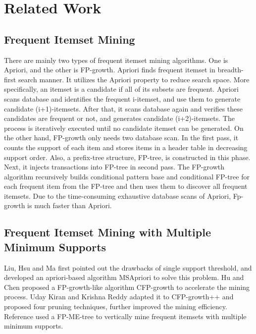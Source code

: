 \documentclass[conference]{IEEEtran}
\begin{document}
\section{Related Work}\label{sec2}
\subsection{Frequent Itemset Mining}
There are mainly two types of frequent itemset mining algorithms. 
One is Apriori\cite{b16}, and the other is FP-growth\cite{b17}. 
Apriori finds frequent itemset in breadth-first search manner. 
It utilizes the Apriori property to reduce search space. 
More specifically, an itemset is a candidate if all of its subsets are frequent. 
Apriori scans database and identifies the frequent i-itemset, and use them to generate candidate (i+1)-itemsets. 
After that, it scans database again and verifies these candidates are frequent or not, and generates candidate (i+2)-itemsets. 
The process is iteratively executed until no candidate itemset can be generated. 
On the other hand, FP-growth only needs two database scan. 
In the first pass, it counts the support of each item and stores items in a header table in decreasing support order. 
Also, a prefix-tree structure, FP-tree, is constructed in this phase. 
Next, it injects transactions into FP-tree in second pass. 
The FP-growth algorithm recursively builds conditional pattern base and conditional FP-tree for each frequent item from the FP-tree and then uses them to discover all frequent itemsets. 
Due to the time-consuming exhaustive database scans of Apriori, Fp-growth is much faster than Apriori.

\subsection{Frequent Itemset Mining with Multiple Minimum Supports}
Liu, Hsu and Ma \cite{b2} first pointed out the drawbacks of single support threshold, and developed an apriori-based algorithm MSApriori to solve this problem. 
Hu and Chen \cite{b18} proposed a FP-growth-like algorithm CFP-growth to accelerate the mining process. 
Uday Kiran and Krishna Reddy \cite{b4} adapted it to CFP-growth++ and proposed four pruning techniques, further improved the mining efficiency. 
Reference \cite{b5} used a FP-ME-tree to vertically mine frequent itemsets with multiple minimum supports. 
\end{document}

